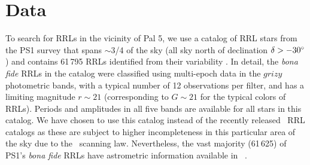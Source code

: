 \documentclass[twocolumn]{aastex63}
\begin{document}
\section{Data} \label{sec:data}


To search for RRLs in the vicinity of Pal 5, we use a catalog of RRL stars from the PS1 survey that spans $\sim$3/4 of the sky (all sky north of declination $\delta > -30\mbox{$^\circ$}$) and contains 61\,795 RRLs identified from their variability \citep{Sesar:2017b}.
In detail, the \emph{bona fide} RRLs in the catalog were classified using multi-epoch data in the $grizy$ photometric bands, with a typical number of 12 observations per filter, and has a limiting magnitude $r\sim21$ (corresponding to $G \sim 21$ for the typical colors of RRLs).
Periods and amplitudes in all five bands are available for all stars in this catalog.
We have chosen to use this catalog instead of the recently released \Gaia~RRL catalogs \citep[VariClassifier and Specific Object Studies][]{Holl2018, Rimoldini2018, Clementini2018} as these are subject to higher incompleteness in this particular area of the sky due to the \Gaia\ scanning law. Nevertheless, the vast majority (61\,625) of PS1's \emph{bona fide} RRLs have astrometric information available in \Gaia~.
\end{document}
